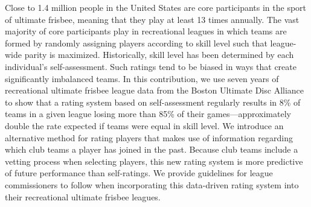 Close to 1.4 million people in the United States are core participants in the sport of ultimate frisbee, meaning that they play at least 13 times annually. The vast majority of core participants play in recreational leagues in which teams are formed by randomly assigning players according to skill level such that league-wide parity is maximized. Historically, skill level has been determined by each individual’s self-assessment. Such ratings tend to be biased in ways that create significantly imbalanced teams. In this contribution, we use seven years of recreational ultimate frisbee league data from the Boston Ultimate Disc Alliance to show that a rating system based on self-assessment regularly results in 8\% of teams in a given league losing more than 85\% of their games---approximately double the rate expected if teams were equal in skill level.  We introduce an alternative method for rating players that makes use of information regarding which club teams a player has joined in the past. Because club teams include a vetting process when selecting players, this new rating system is more predictive of future performance than self-ratings. We provide guidelines for league commissioners to follow when incorporating this data-driven rating system into their recreational ultimate frisbee leagues.